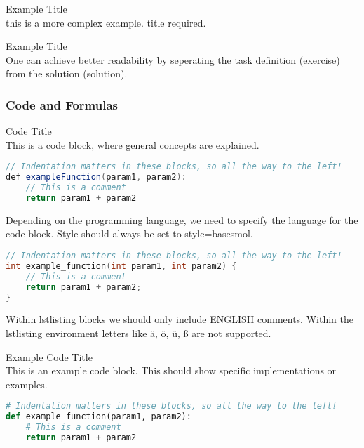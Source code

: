 \begin{example2}{Example Title}\\
    this is a more complex example. title required.
\end{example2}

\begin{example2}{Example Title}\\
    One can achieve better readability by seperating the task definition (exercise)
    \tcblower
    from the solution (solution).
\end{example2}

\subsubsection{Code and Formulas}

\begin{code}{Code Title}\\
    This is a code block, where general concepts are explained.
\begin{lstlisting}[language=Java, style=basesmol]
// Indentation matters in these blocks, so all the way to the left!
def exampleFunction(param1, param2):
    // This is a comment
    return param1 + param2
\end{lstlisting}

    Depending on the programming language, we need to specify the language for the code block. Style should always be set to style=basesmol.

\begin{lstlisting}[language=C, style=basesmol]
// Indentation matters in these blocks, so all the way to the left!
int example_function(int param1, int param2) {
    // This is a comment
    return param1 + param2;
}
\end{lstlisting}

     Within lstlisting blocks we should only include ENGLISH comments. 
    Within the lstlisting environment letters like ä, ö, ü, ß are not supported.
\end{code}

\begin{examplecode}{Example Code Title}\\
    This is an example code block. This should show specific implementations or examples.
\begin{lstlisting}[language=Python, style=basesmol]
# Indentation matters in these blocks, so all the way to the left!
def example_function(param1, param2):
    # This is a comment
    return param1 + param2
\end{lstlisting}
\end{examplecode}

